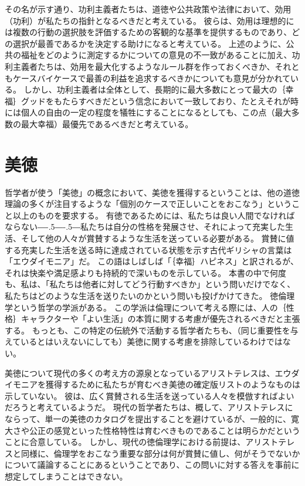 \documentclass[paper=a4,book,openany]{jlreq}
\def\DDASH{―\kern-.5\zw―\kern-.5\zw―} %
\begin{document}
その名が示す通り、功利主義者たちは、道徳や公共政策や法律において、効用（功利）が私たちの指針となるべきだと考えている。
彼らは、効用は理想的には複数の行動の選択肢を評価するための客観的な基準を提供するものであり、どの選択が最善であるかを決定する助けになると考えている。
上述のように、公共の福祉をどのように測定するかについての意見の不一致があることに加え、功利主義者たちは、効用を最大化するようなルール群を作っておくべきか、それともケースバイケースで最善の利益を追求するべきかについても意見が分かれている。
しかし、功利主義者は全体として、長期的に最大多数にとって最大の｛幸福｝{グッド}をもたらすべきだという信念において一致しており、たとえそれが時には個人の自由の一定の程度を犠牲にすることになるとしても、この点（最大多数の最大幸福）最優先であるべきだと考えている。

\section{美徳}

哲学者が使う「美徳」の概念において、美徳を獲得するということは、他の道徳理論の多くが注目するような「個別のケースで正しいことをおこなう」ということ以上のものを要求する。
有徳であるためには、私たちは良い人間でなければならない{\DDASH}私たちは自分の性格を発展させ、それによって充実した生活、そして他の人々が賞賛するような生活を送っている必要がある。
賞賛に値する充実した生活を送る時に達成されている状態を示す古代ギリシャの言葉は「エウダイモニア」だ。
この語はしばしば「｛幸福｝{ハピネス}」と訳されるが、それは快楽や満足感よりも持続的で深いものを示している。
本書の中で何度も、私は、「私たちは他者に対してどう行動すべきか」という問いだけでなく、私たちはどのような生活を送りたいのかという問いも投げかけてきた。
徳倫理学という哲学の学派がある。
この学派は倫理について考える際には、人の｛性格｝{キャラクター}や「よい生活」の本質に関する考慮が優先されるべきだと主張する。
もっとも、この特定の伝統外で活動する哲学者たちも、（同じ重要性を与えているとはいえないにしても）美徳に関する考慮を排除しているわけではない。

美徳について現代の多くの考え方の源泉となっているアリストテレスは、エウダイモニアを獲得するために私たちが育むべき美徳の確定版リストのようなものは示していない。
彼は、広く賞賛される生活を送っている人々を模倣すればよいだろうと考えているようだ。
現代の哲学者たちは、概して、アリストテレスにならって、単一の美徳のカタログを提出することを避けているが、一般的に、寛大さや公正の感覚といった性格特性は育むべきものであることは明らかだということに合意している。
しかし、現代の徳倫理学における前提は、アリストテレスと同様に、倫理学をおこなう重要な部分は何が賞賛に値し、何がそうでないかについて議論することにあるということであり、この問いに対する答えを事前に想定してしまうことはできない。
\end{document}
